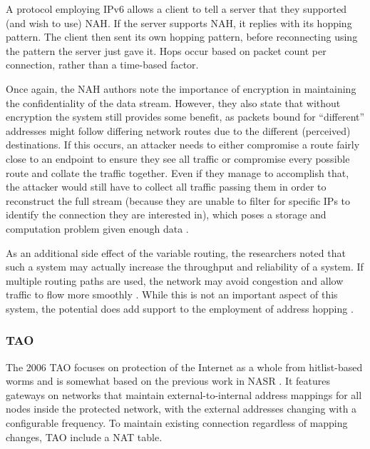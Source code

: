 \par A protocol employing \ac{IPv6} allows a client to tell a server that they supported (and wish to use) \ac{NAH}. If the server supports NAH, it replies with its hopping pattern. The client then sent its own hopping pattern, before reconnecting using the pattern the server just gave it. Hops occur based on packet count per connection, rather than a time-based factor.

\par Once again, the NAH authors note the importance of encryption in maintaining the confidentiality of the data stream. However, they also state that without encryption the system still provides some benefit, as packets bound for ``different'' addresses might follow differing network routes due to the different (perceived) destinations. If this occurs, an attacker needs to either compromise a route fairly close to an endpoint to ensure they see all traffic or compromise every possible route and collate the traffic together. Even if they manage to accomplish that, the attacker would still have to collect all traffic passing them in order to reconstruct the full stream (because they are unable to filter for specific \acp{IP} to identify the connection they are interested in), which poses a storage and computation problem given enough data \cite{NAH}.

\par As an additional side effect of the variable routing, the researchers noted that such a system may actually increase the throughput and reliability of a system. If multiple routing paths are used, the network may avoid congestion and allow traffic to flow more smoothly \cite{MultimediaDistributed}. While this is not an important aspect of this system, the potential does add support to the employment of address hopping \cite{NAH}.

\subsubsection{\acf{TAO}}
\par The 2006 \ac{TAO} focuses on protection of the Internet as a whole from hitlist-based worms and is somewhat based on the previous work in \ac{NASR} \cite{NASR}. It features gateways on networks that maintain external-to-internal address mappings for all nodes inside the protected network, with the external addresses changing with a configurable frequency. To maintain existing connection regardless of mapping changes, TAO include a \ac{NAT} table. 

